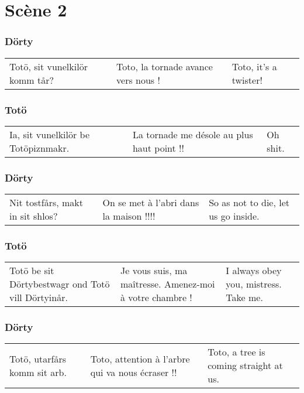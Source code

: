 \chapter*{Scène 2}
\subsection*{Dörty}
\begin{tabular}{p{3.7cm}|p{3.7cm}|p{3.7cm}}
Totö, sit vunelkilör komm tår?&
Toto, la tornade avance vers nous !&
Toto, it's a twister!
\end{tabular}\par
\subsection*{Totö}
\begin{tabular}{p{3.7cm}|p{3.7cm}|p{3.7cm}}
Ia, sit vunelkilör be Totöpiznmakr.&
La tornade me désole au plus haut point !!&
Oh shit.
\end{tabular}\par
\subsection*{Dörty}
\begin{tabular}{p{3.7cm}|p{3.7cm}|p{3.7cm}}
Nit tostfårs, makt in sit shlos?&
On se met à l'abri dans la maison !!!!&
So as not to die, let us go inside.
\end{tabular}\par
\subsection*{Totö}
\begin{tabular}{p{3.7cm}|p{3.7cm}|p{3.7cm}}
Totö be sit Dörtybestwagr ond Totö vill Dörtyinår.&
Je vous suis, ma maîtresse. Amenez-moi à votre chambre !&
I always obey you, mistress. Take me.
\end{tabular}\par
[\emph{Ils rentrent dans la maison.}]
\subsection*{Dörty}
\begin{tabular}{p{3.7cm}|p{3.7cm}|p{3.7cm}}
Totö, utarfårs komm sit arb.&
Toto, attention à l'arbre qui va nous écraser !!&
Toto, a tree is coming straight at us.
\end{tabular}\par
[\emph{Un arbre frappe Dörty. Elle est allongée sur son lit sans
connaissance.}]
